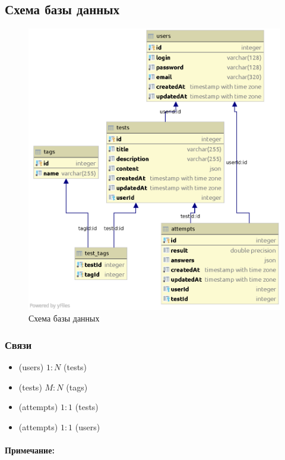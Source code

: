 \subsection{Схема базы данных}
\begin{figure}[h!]
    \begin{center}
        \includegraphics[scale=0.6]{images/db_scheme.eps}
    \end{center}
    \caption{Схема базы данных}
\end{figure}

\subsubsection{Связи}
\begin{itemize}
    \item (users) $1:N$ (tests)
    \item (tests) $M:N$ (tags)
    \item (attempts) $1:1$ (tests)
    \item (attempts) $1:1$ (users)
\end{itemize}
\paragraph{Примечание:}

